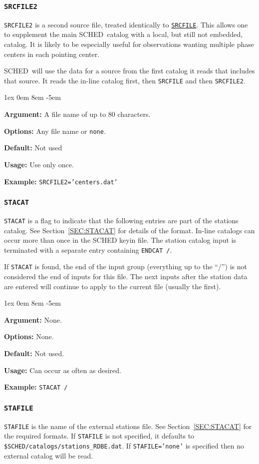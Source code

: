 \documentclass{report}
\newcommand{\schedb}{{\sc SCHED~}}
\newcommand{\rcwbox}[5]{
  \begin{list}{}{\parsep 1ex  \itemsep 0em
                 \leftmargin 8em  \itemindent -5em }
    \item {\bf Argument:} #1
    \item {\bf Options:}  #2
    \item {\bf Default:}  #3
    \item {\bf Usage:}    #4
    \item {\bf Example:}  #5
  \end{list}
}
\begin{document}
\subsubsection{\label{MP:SRCFILE2}{\tt SRCFILE2}}

{\tt SRCFILE2} is a second source file, treated identically to
{\hyperref[MP:SRCFILE]{{\tt SRCFILE}}}.  This allows one to supplement
the main \schedb catalog with a local, but still not embedded,
catalog.  It is likely to be especially useful for observations
wanting multiple phase centers in each pointing center.

\schedb will use the data for a source from the first catalog it
reads that includes that source.  It reads the in-line catalog first,
then {\tt SRCFILE} and then {\tt SRCFILE2}.

\rcwbox
{A file name of up to 80 characters.}
{Any file name or {\tt none}.}
{Not used}
{Use only once.}
{{\tt SRCFILE2='centers.dat'}}


\subsubsection{\label{MP:STACAT}{\tt STACAT}}

{\tt STACAT} is a flag to indicate that the following entries are part
of the stations catalog. See Section~\ref{SEC:STACAT} for details of
the format. In-line catalogs can occur more than once in the {\sc
SCHED} keyin file.  The station catalog input is terminated with a
separate entry containing {\tt ENDCAT /}.

If {\tt STACAT} is found, the end of the input group (everything up to
the ``/'') is not considered the end of inputs for this file.  The
next inputs after the station data are entered will continue to apply
to the current file (usually the first).

\rcwbox
{None.}
{None.}
{Not used.}
{Can occur as often as desired.}
{{\tt STACAT /}}


\subsubsection{\label{MP:STAFILE}{\tt STAFILE}}

{\tt STAFILE} is the name of the external stations file. See
Section~\ref{SEC:STACAT} for the required formats. If {\tt STAFILE} is
not specified, it defaults to {\tt
\$SCHED/catalogs/stations\_RDBE.dat}.  If {\tt STAFILE='none'} is
specified then no external catalog will be read.
\end{document}
